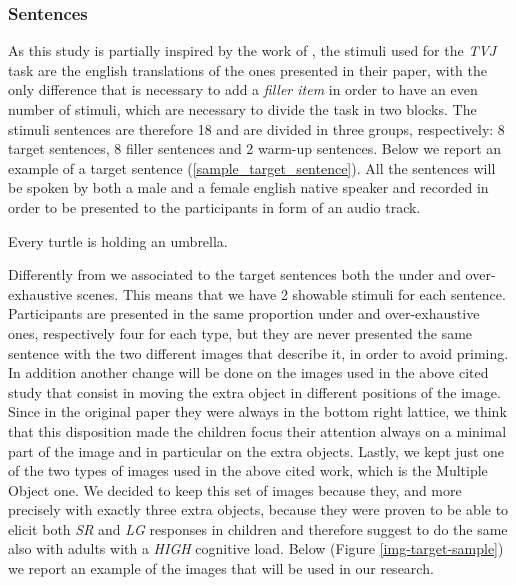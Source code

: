\documentclass[10pt, a4]{article}
\begin{document}
\subsubsection{Sentences}
As this study is partially inspired by the work of \cite{minai2012hinders}, the stimuli used for the \textit{TVJ} task are the
english translations of the ones presented in their paper, with the only difference that is necessary to add a
\textit{filler item} in order to have an even number of stimuli, which are necessary to divide the task in two blocks.
The stimuli sentences are therefore 18 and are divided in three groups, respectively: 8 target sentences, 8 filler sentences
and 2 warm-up sentences. Below we report an example of a target sentence (\ref{sample_target_sentence}).
All the sentences will be spoken by both a male and a female english native speaker and
recorded in order to be presented to the participants in form of an audio track.

\begin{exe}
    \ex  Every turtle is holding an umbrella. \label{sample_target_sentence}
\end{exe}

Differently from \cite{minai2012hinders} we associated to the target sentences both the under and over-exhaustive scenes. This means
that we have 2 showable stimuli for each sentence. Participants are presented in the same proportion under and over-exhaustive ones,
respectively four for each type, but they are never presented the same sentence with the two different images that describe it, in order to avoid priming.
In addition another change will be done on the images used in the above cited study that consist in moving the extra object in different positions
of the image. Since in the original paper they were always in the bottom right lattice, we think that this disposition made the children focus their
attention always on a minimal part of the image and in particular on the extra objects. Lastly, we kept just one of the two types of images
used in the above cited work, which is the Multiple Object one. We decided to keep this set of images because they, and more precisely with exactly
three extra objects, because they were proven to be able to elicit both \textit{SR} and \textit{LG} responses in children and therefore suggest to
do the same also with adults with a \textit{HIGH} cognitive load. Below (Figure \ref{img-target-sample}) we report an example of the images that
will be used in our research. 
\end{document}
